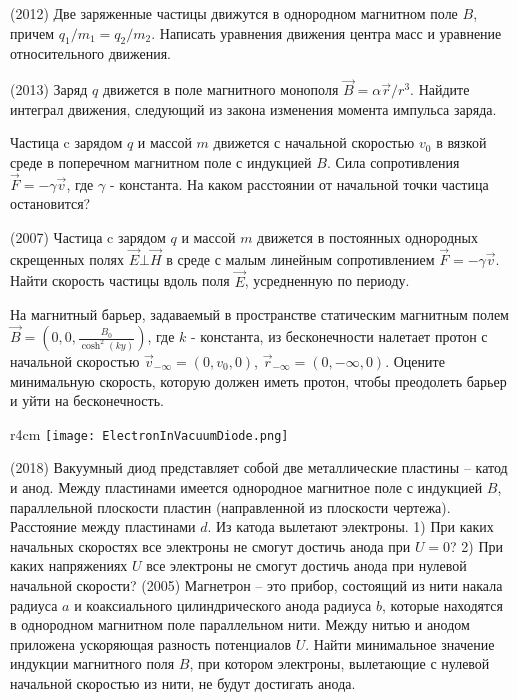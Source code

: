 \AddProb (2012) Две заряженные частицы движутся в однородном магнитном поле $B$, причем $q_1/m_1 = q_2/m_2$. Написать уравнения движения центра масс и уравнение относительного движения.

\AddProb (2013) Заряд $q$ движется в поле магнитного монополя $\vec{B} = \alpha \vec{r}/r^3$. Найдите интеграл движения, следующий из закона изменения момента импульса заряда.

\AddProb Частица c зарядом $q$ и массой $m$ движется с начальной скоростью $v_0$ в вязкой среде в поперечном магнитном поле с индукцией $B$. Сила сопротивления $\vec{F} = -\gamma \vec{v}$, где $\gamma$ - константа. На каком расстоянии от начальной точки частица остановится?

\AddProb (2007) Частица c зарядом $q$ и массой $m$ движется в постоянных однородных скрещенных полях $\vec{E} \bot \vec{H}$ в среде с малым линейным сопротивлением $\vec{F} = -\gamma \vec{v}$. Найти скорость частицы вдоль поля $\vec{E}$, усредненную по периоду.

\AddProb На магнитный барьер, задаваемый в пространстве статическим магнитным полем $\vec{B} = \left(0, 0, \frac{B_0}{\cosh^2(ky)}\right)$, где $k$ - константа, из бесконечности налетает протон с начальной скоростью $\vec{v}_{-\infty} = (0, v_0, 0)$, $\vec{r}_{-\infty} = (0, -\infty, 0)$. Оцените минимальную скорость, которую должен иметь протон, чтобы преодолеть барьер и уйти на бесконечность. 

\begin{wrapfigure}{r}{4cm}
\texttt{[image: ElectronInVacuumDiode.png]}
\end{wrapfigure}
\AddProb (2018) Вакуумный диод представляет собой две металлические пластины -- катод и анод. Между пластинами имеется однородное магнитное поле с индукцией $B$, параллельной плоскости пластин (направленной из плоскости чертежа). Расстояние между пластинами $d$. Из катода вылетают электроны. 1) При каких начальных скоростях все электроны не смогут достичь анода при $U = 0$? 2) При каких напряжениях $U$ все электроны не смогут достичь анода при нулевой начальной скорости?
\AddProb (2005)  Магнетрон -- это прибор, состоящий из нити накала радиуса $a$ и коаксиального цилиндрического анода радиуса $b$, которые находятся в однородном магнитном поле параллельном нити. Между нитью и анодом приложена ускоряющая разность потенциалов $U$. Найти минимальное значение индукции магнитного поля $B$, при котором электроны, вылетающие с нулевой начальной скоростью из нити, не будут достигать анода.

